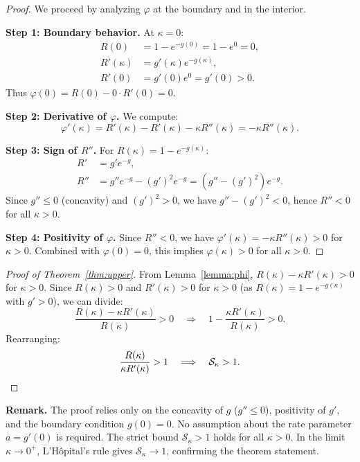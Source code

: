 \documentclass[11pt,twocolumn]{article}
\begin{document}
\begin{proof}
We proceed by analyzing $\varphi$ at the boundary and in the interior.

\textbf{Step 1: Boundary behavior.} At $\kappa = 0$:
\begin{align}
R(0) &= 1 - e^{-g(0)} = 1 - e^0 = 0, \\
R'(\kappa) &= g'(\kappa) e^{-g(\kappa)}, \\
R'(0) &= g'(0) e^0 = g'(0) > 0.
\end{align}
Thus $\varphi(0) = R(0) - 0 \cdot R'(0) = 0$.

\textbf{Step 2: Derivative of $\varphi$.} We compute:
\begin{equation}
\varphi'(\kappa) = R'(\kappa) - R'(\kappa) - \kappa R''(\kappa) = -\kappa R''(\kappa).
\end{equation}

\textbf{Step 3: Sign of $R''$.} For $R(\kappa) = 1 - e^{-g(\kappa)}$:
\begin{align}
R' &= g' e^{-g}, \\
R'' &= g'' e^{-g} - (g')^2 e^{-g} = (g'' - (g')^2) e^{-g}.
\end{align}
Since $g'' \leq 0$ (concavity) and $(g')^2 > 0$, we have $g'' - (g')^2 < 0$, hence $R'' < 0$ for all $\kappa > 0$.

\textbf{Step 4: Positivity of $\varphi$.} Since $R'' < 0$, we have $\varphi'(\kappa) = -\kappa R''(\kappa) > 0$ for $\kappa > 0$. Combined with $\varphi(0) = 0$, this implies $\varphi(\kappa) > 0$ for all $\kappa > 0$.
\end{proof}

\begin{proof}[Proof of Theorem~\ref{thm:upper}]
From Lemma~\ref{lemma:phi}, $R(\kappa) - \kappa R'(\kappa) > 0$ for $\kappa > 0$. Since $R(\kappa) > 0$ and $R'(\kappa) > 0$ for $\kappa > 0$ (as $R(\kappa) = 1 - e^{-g(\kappa)}$ with $g' > 0$), we can divide:
\begin{equation}
\frac{R(\kappa) - \kappa R'(\kappa)}{R(\kappa)} > 0 \quad \Longrightarrow \quad 1 - \frac{\kappa R'(\kappa)}{R(\kappa)} > 0.
\end{equation}
Rearranging:
\begin{equation}
\frac{R(\kappa)}{\kappa R'(\kappa)} > 1 \quad \Longrightarrow \quad \mathcal{S}_\kappa > 1. \qedhere
\end{equation}
\end{proof}

\textbf{Remark.} The proof relies only on the concavity of $g$ ($g'' \leq 0$), positivity of $g'$, and the boundary condition $g(0) = 0$. No assumption about the rate parameter $a = g'(0)$ is required. The strict bound $\mathcal{S}_\kappa > 1$ holds for all $\kappa > 0$. In the limit $\kappa \to 0^+$, L'H\^{o}pital's rule gives $\mathcal{S}_\kappa \to 1$, confirming the theorem statement.
\end{document}
